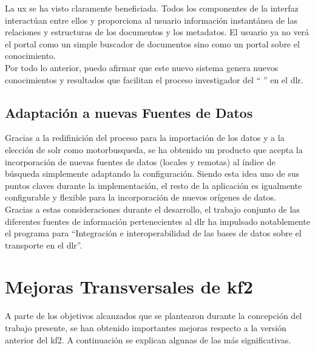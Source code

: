 La \gls{ux} se ha visto claramente beneficiada. Todos los componentes de la interfaz interactúan entre ellos y proporciona al usuario información instantánea de las relaciones y estructuras de los documentos y los \glspl{metadato}. El usuario ya no verá el portal como un simple buscador de documentos sino como un portal sobre el conocimiento.\\

Por todo lo anterior, puedo afirmar que este nuevo sistema genera nuevos conocimientos y resultados que facilitan el proceso investigador del `` \transmov'' en el \gls{dlr}.

\subsection{Adaptación a nuevas Fuentes de Datos}
Gracias a la redifinición del proceso para la importación de los datos y a la elección de \gls{solr} como \gls{motorbusqueda}, se ha obtenido un producto que acepta la incorporación de nuevas fuentes de datos (locales y remotas) al índice de búsqueda simplemente adaptando la configuración. Siendo esta idea uno de sus puntos claves durante la implementación, el resto de la aplicación es igualmente configurable y flexible para la incorporación de nuevos orígenes de datos.\\

Gracias a estas consideraciones durante el desarrollo, el trabajo conjunto de las diferentes fuentes de información pertenecientes al \gls{dlr} ha impulsado notablemente el programa para ``Integración e interoperabilidad de las bases de datos sobre el transporte en el \gls{dlr}''.


\begin{comment}
Sistema de visualización
- representación visual muy clara y feliz para el usuario
- no traumatico para los usuarios actuales, -> se añade la visualizacion
- facilita el proces investigardor
- Representación clara e intuitiva de las nuevas estructuras
- Mejora experiencia usuario, previsualizar datos antes qeu pase


Sistema de importacion
- adaptable a varias fuentes de datos sin modificar codigo
\end{comment}

\section{Mejoras Transversales de \gls{kf2}}
A parte de los objetivos alcanzados que se plantearon durante la concepción del trabajo presente, se han obtenido importantes mejoras respecto a la versión anterior del \gls{kf2}. A continuación se explican algunas de las más significativas.

